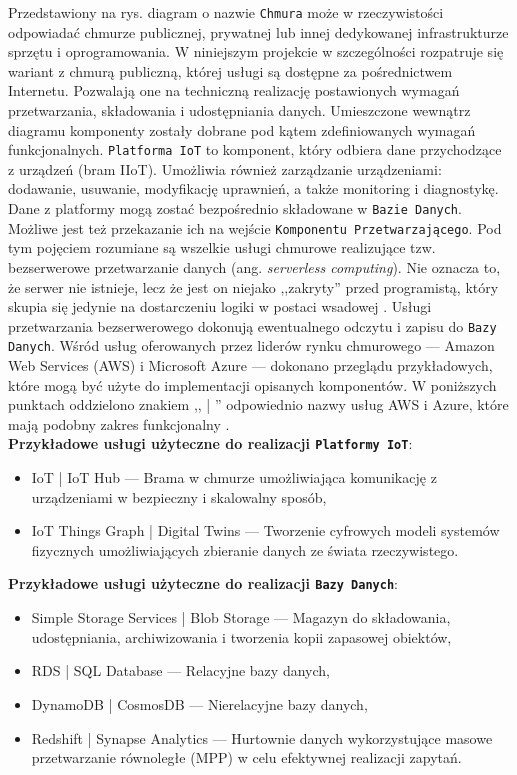 \documentclass[a4paper, 12pt, twoside]{article}
\begin{document}
Przedstawiony na rys.  diagram o nazwie \texttt{Chmura}
może w rzeczywistości odpowiadać chmurze publicznej, prywatnej lub innej
dedykowanej infrastrukturze sprzętu i oprogramowania. W niniejszym projekcie
w szczególności rozpatruje się wariant z chmurą publiczną, której usługi są dostępne
za pośrednictwem Internetu. Pozwalają one na techniczną realizację postawionych
wymagań przetwarzania, składowania i udostępniania danych.
Umieszczone wewnątrz diagramu komponenty zostały dobrane
pod kątem zdefiniowanych wymagań funkcjonalnych. \texttt{Platforma IoT}
to komponent, który odbiera dane przychodzące z urządzeń (bram IIoT).
Umożliwia również zarządzanie urządzeniami:
dodawanie, usuwanie, modyfikację uprawnień, a także monitoring i diagnostykę.
Dane z platformy mogą zostać bezpośrednio składowane w \texttt{Bazie Danych}.
Możliwe jest też przekazanie ich na wejście \texttt{Komponentu Przetwarzającego}.
Pod tym pojęciem rozumiane są wszelkie usługi chmurowe realizujące tzw. bezserwerowe
przetwarzanie danych (ang. \emph{serverless computing}). Nie oznacza to, że
serwer nie istnieje, lecz że jest on niejako ,,zakryty'' przed programistą, który skupia
się jedynie na dostarczeniu logiki w postaci wsadowej \cite{azure-serverless}.
Usługi przetwarzania bezserwerowego dokonują ewentualnego odczytu i zapisu do \texttt{Bazy Danych}.
Wśród usług oferowanych przez liderów rynku chmurowego
--- Amazon Web Services (AWS) i Microsoft Azure \cite{gartner-cloud-liders}
--- dokonano przeglądu przykładowych, które mogą być użyte do implementacji opisanych komponentów.
W poniższych punktach oddzielono znakiem ,, | '' odpowiednio nazwy usług AWS i Azure,
które mają podobny zakres funkcjonalny \cite{azure-aws-comparison}.\\

\noindent\textbf{Przykładowe usługi użyteczne do realizacji \texttt{Platformy IoT}}:
\begin{itemize}
      \itemsep0em
      \item IoT | IoT Hub ---  Brama w chmurze umożliwiająca komunikację z
            urządzeniami w bezpieczny i skalowalny sposób,
      \item IoT Things Graph | Digital Twins --- Tworzenie cyfrowych modeli systemów
            fizycznych umożliwiających zbieranie danych ze świata rzeczywistego.
\end{itemize}

\noindent\textbf{Przykładowe usługi użyteczne do realizacji \texttt{Bazy Danych}}:
\begin{itemize}
      \itemsep0em
      \item Simple Storage Services | Blob Storage --- Magazyn do składowania,
            udostępniania, archiwizowania i tworzenia kopii zapasowej obiektów,
      \item RDS | SQL Database --- Relacyjne bazy danych,
      \item DynamoDB | CosmosDB --- Nierelacyjne bazy danych,
      \item Redshift | Synapse Analytics --- Hurtownie danych wykorzystujące
            masowe przetwarzanie równoległe (MPP) w celu efektywnej realizacji zapytań.
\end{itemize}
\end{document}
